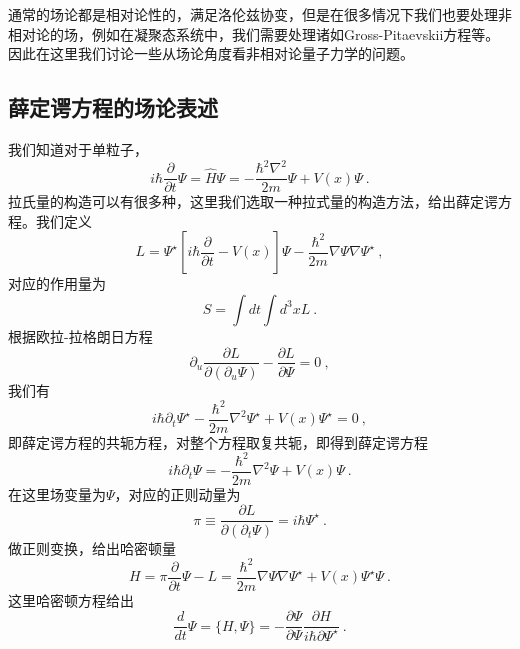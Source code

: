 
\begin{issues}
\issueDraft
\end{issues}

通常的场论都是相对论性的，满足洛伦兹协变，但是在很多情况下我们也要处理非相对论的场，例如在凝聚态系统中，我们需要处理诸如Gross-Pitaevskii方程等。因此在这里我们讨论一些从场论角度看非相对论量子力学的问题。
\subsection{薛定谔方程的场论表述}
我们知道对于单粒子，
\begin{equation}
i\hbar \frac{\partial}{\partial t} \Psi = \hat{H} \Psi = -\frac{\hbar^2 \nabla^2}{2m} \Psi + V(x)\Psi ~.
\end{equation}
拉氏量的构造可以有很多种，这里我们选取一种拉式量的构造方法，给出薛定谔方程。我们定义
$$
L =  \Psi^\star [i\hbar \frac{\partial}{\partial t}  - V(x)]\Psi - \frac{\hbar^2}{2m}\nabla \Psi \nabla \Psi^\star~,
$$
对应的作用量为
$$
S = \int dt \int d^3 x L~.
$$
根据欧拉-拉格朗日方程
$$
\partial_u \frac{\partial L}{\partial (\partial_u \Psi)} - \frac{\partial L}{\partial \Psi}=0 ~,
$$
我们有
$$
i\hbar \partial_t \Psi^\star - \frac{\hbar^2}{2m}\nabla^2 \Psi^\star + V(x)\Psi^\star=0 ~,
$$
即薛定谔方程的共轭方程，对整个方程取复共轭，即得到薛定谔方程
$$
i\hbar \partial_t \Psi = -\frac{\hbar^2}{2m}\nabla^2 \Psi + V(x)\Psi ~.
$$
在这里场变量为$\Psi$，对应的正则动量为
$$
\pi \equiv \frac{\partial L}{\partial (\partial_t \Psi)} = i\hbar \Psi^\star~.
$$
做正则变换，给出哈密顿量
$$
H = \pi \frac{\partial}{\partial t}\Psi - L =  \frac{\hbar^2}{2m} \nabla\Psi \nabla \Psi^\star+ V(x)\Psi^\star\Psi~.
$$
这里哈密顿方程给出
$$
\frac{d}{d t}\Psi = \{H,\Psi\} = -\frac{\partial \Psi}{\partial \Psi}\frac{\partial H}{i\hbar \partial \Psi^\star}~.
$$
